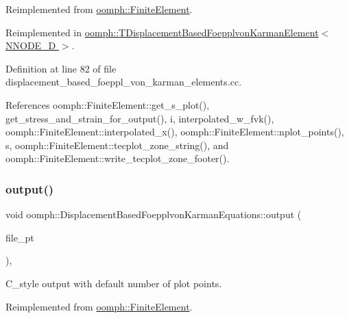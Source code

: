 Reimplemented from \hyperlink{classoomph_1_1FiniteElement_afa9d9b2670f999b43e6679c9dd28c457}{oomph\+::\+Finite\+Element}.



Reimplemented in \hyperlink{classoomph_1_1TDisplacementBasedFoepplvonKarmanElement_aa763fb490c43b132ea3322cad5f1662f}{oomph\+::\+T\+Displacement\+Based\+Foepplvon\+Karman\+Element$<$ N\+N\+O\+D\+E\+\_\+D $>$}.



Definition at line 82 of file displacement\+\_\+based\+\_\+foeppl\+\_\+von\+\_\+karman\+\_\+elements.\+cc.



References oomph\+::\+Finite\+Element\+::get\+\_\+s\+\_\+plot(), get\+\_\+stress\+\_\+and\+\_\+strain\+\_\+for\+\_\+output(), i, interpolated\+\_\+w\+\_\+fvk(), oomph\+::\+Finite\+Element\+::interpolated\+\_\+x(), oomph\+::\+Finite\+Element\+::nplot\+\_\+points(), s, oomph\+::\+Finite\+Element\+::tecplot\+\_\+zone\+\_\+string(), and oomph\+::\+Finite\+Element\+::write\+\_\+tecplot\+\_\+zone\+\_\+footer().

\mbox{\label{classoomph_1_1DisplacementBasedFoepplvonKarmanEquations_ac969427e1333e212f74e5d2833d1c1b7}} 
\subsubsection{\texorpdfstring{output()}{output()}\hspace{0.1cm}{\footnotesize\ttfamily [3/4]}}
{\footnotesize\ttfamily void oomph\+::\+Displacement\+Based\+Foepplvon\+Karman\+Equations\+::output (\begin{DoxyParamCaption}\item[{F\+I\+LE $\ast$}]{file\+\_\+pt }\end{DoxyParamCaption})\hspace{0.3cm}{\ttfamily [inline]}, {\ttfamily [virtual]}}



C\+\_\+style output with default number of plot points. 



Reimplemented from \hyperlink{classoomph_1_1FiniteElement_a72cddd09f8ddbee1a20a1ff404c6943e}{oomph\+::\+Finite\+Element}.



